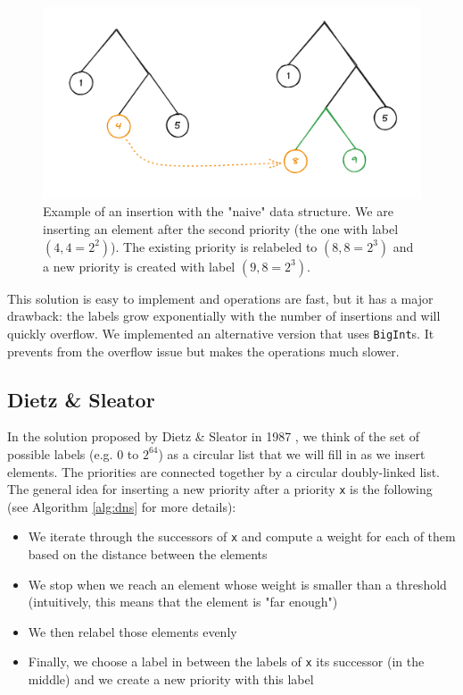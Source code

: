 \documentclass[12pt]{article}
\begin{document}
\begin{figure}[h!]
    \includegraphics[width=450px, keepaspectratio]{./naive-ex.png}
    \caption{Example of an insertion with the "naive" data structure. We are inserting an element after the second priority (the one with label $(4,4 = 2^2)$). The existing priority is relabeled to $(8,8 = 2^3)$ and a new priority is created with label $(9,8 = 2^3)$.}
    \label{naive}
\end{figure}


This solution is easy to implement and operations are fast, but it has a major drawback: the labels grow exponentially with the number of insertions and will quickly overflow.
We implemented an alternative version that uses \texttt{BigInt}s. It prevents from the overflow issue but makes the operations much slower.

\subsection{Dietz \& Sleator}

In the solution proposed by Dietz \& Sleator in 1987 \cite{10.1145/28395.28434}, we think of the set of possible labels (e.g. $0$ to $2^{64}$) as a circular list that we will fill in as we insert elements.
The priorities are connected together by a circular doubly-linked list.
The general idea for inserting a new priority after a priority \texttt{x} is the following (see Algorithm \ref{alg:dns} for more details):
\begin{itemize}
    \item We iterate through the successors of \texttt{x} and compute a weight for each of them based on the distance between the elements
    \item We stop when we reach an element whose weight is smaller than a threshold (intuitively, this means that the element is "far enough")
    \item We then relabel those elements evenly
    \item Finally, we choose a label in between the labels of \texttt{x} its successor (in the middle) and we create a new priority with this label
\end{itemize}
\end{document}
